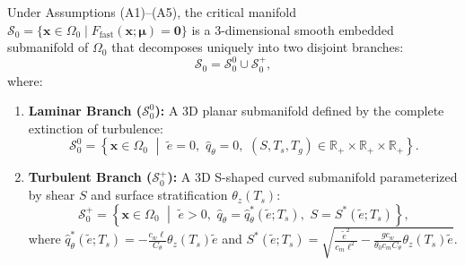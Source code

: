 \begin{theorem}
\label{thm:manifold_existence}
Under Assumptions \textnormal{(A1)--(A5)}, the critical manifold $\mathcal{S}_0 = \{\mathbf{x} \in \Omega_0 \mid F_{\mathrm{fast}}(\mathbf{x};\boldsymbol{\mu}) = \mathbf{0}\}$ is a 3-dimensional smooth embedded submanifold of $\Omega_0$ that decomposes uniquely into two disjoint branches:
\begin{equation}
\mathcal{S}_0 = \mathcal{S}_0^0 \cup \mathcal{S}_0^+,
\end{equation}
where:
\begin{enumerate}
    \item \textbf{Laminar Branch ($\mathcal{S}_0^0$):} A 3D planar submanifold defined by the complete extinction of turbulence:
    \begin{equation}
    \mathcal{S}_0^0 = \left\{ \mathbf{x} \in \Omega_0 \,\,\middle\vert\,\, \tilde e = 0, \,\, \hat q_\theta = 0, \,\, (S, T_s, T_g) \in \mathbb{R}_+ \times \mathbb{R}_+ \times \mathbb{R}_+ \right\}.
    \end{equation}
    \item \textbf{Turbulent Branch ($\mathcal{S}_0^+$):} A 3D S-shaped curved submanifold parameterized by shear $S$ and surface stratification $\theta_z(T_s)$:
    \begin{equation}
    \mathcal{S}_0^+ = \left\{ \mathbf{x} \in \Omega_0 \,\,\middle\vert\,\, \tilde e > 0, \,\, \hat q_\theta = \hat q_\theta^*(\tilde e; T_s), \,\, S = S^*(\tilde e; T_s) \right\},
    \end{equation}
    where $\hat q_\theta^*(\tilde e; T_s) = -\frac{c_w \ell}{C_\theta} \theta_z(T_s) \tilde e$ and $S^*(\tilde e; T_s) = \sqrt{ \frac{\tilde e^2}{c_m \ell^2} - \frac{g c_w}{\theta_0 c_m C_\theta} \theta_z(T_s) \tilde e }$.
\end{enumerate}
\end{theorem}

